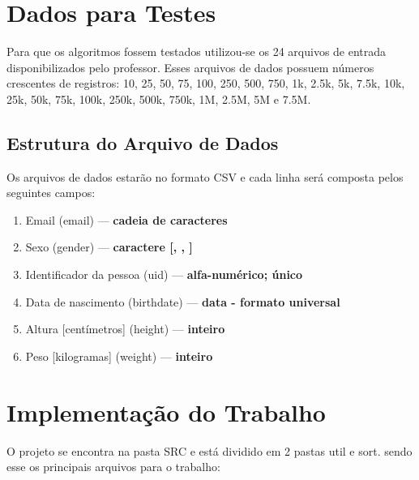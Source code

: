 \documentclass[a4paper,12pt]{scrartcl}
\begin{document}
\section{Dados para Testes}

Para que os algoritmos fossem testados utilizou-se os 24 arquivos de entrada disponibilizados pelo professor. Esses arquivos de dados possuem números crescentes de registros: 10, 25, 50, 75, 100, 250, 500, 750, 1k, 2.5k, 5k, 7.5k, 10k, 25k, 50k, 75k, 100k, 250k, 500k, 750k, 1M, 2.5M, 5M e 7.5M.


\subsection{Estrutura do Arquivo de Dados}

Os arquivos de dados estarão no formato CSV e cada linha será composta pelos seguintes campos:

\begin{enumerate}
    \item Email (email) --- \textbf{cadeia de caracteres}
    \item Sexo (gender) --- \textbf{caractere [, , ]}
    \item Identificador da pessoa (uid) --- \textbf{alfa-numérico; único}
    \item Data de nascimento (birthdate) --- \textbf{data - formato universal}\cite{}
    \item Altura [centímetros] (height) --- \textbf{inteiro}
    \item Peso [kilogramas] (weight) --- \textbf{inteiro}
\end{enumerate}

\section{Implementação do Trabalho}

O projeto se encontra na pasta SRC e está dividido em 2 pastas util e sort. sendo esse os principais arquivos para o trabalho:
\end{document}
